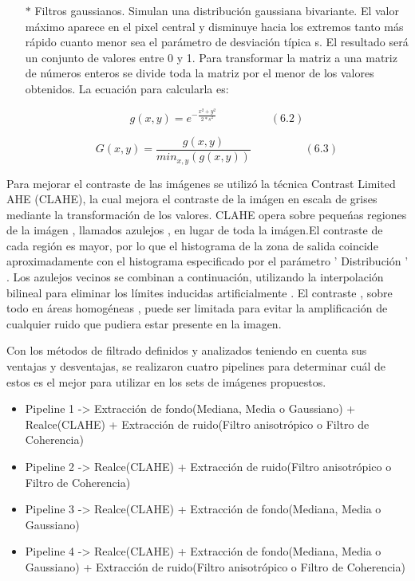 \begin{itemize}
	\item[$*$]Filtros gaussianos. Simulan una distribución gaussiana bivariante. El valor máximo aparece en el pixel central y disminuye hacia los extremos tanto más rápido cuanto menor sea el parámetro de desviación típica s. El resultado será un conjunto de valores entre 0 y 1. Para transformar la matriz a una matriz de números enteros se divide toda la matriz por el menor de los valores obtenidos. La ecuación para calcularla es:
	
	\begin{displaymath}
	g(x,y)=e^{-\frac{x^2+y^2}{2\ast s^2}} \hspace{2cm}(6.2)
	\end{displaymath}
	
	\begin{displaymath}
		G(x,y)=\frac{g(x,y)}{min_{x,y}(g(x,y))} \hspace{2cm}(6.3)
	\end{displaymath}
\end{itemize}


Para mejorar el contraste de las im\'agenes se utiliz\'o la t\'ecnica Contrast Limited AHE (CLAHE), la cual mejora el contraste  de la im\'agen en escala de grises mediante la transformaci\'on de los valores. CLAHE opera sobre peque\'nas regiones de la im\'agen , llamados azulejos , en lugar de toda la im\'agen.El contraste de cada regi\'on es mayor, por lo que el histograma de la zona de salida coincide aproximadamente con el histograma especificado por el parámetro ' Distribución ' . Los azulejos vecinos se combinan a continuación, utilizando la interpolación bilineal para eliminar los límites inducidas artificialmente . El contraste , sobre todo en áreas homogéneas , puede ser limitada para evitar la amplificación de cualquier ruido que pudiera estar presente en la imagen. \cite{wiki:clahe}


Con los métodos de filtrado definidos y analizados teniendo en cuenta sus ventajas y desventajas, se realizaron cuatro pipelines para determinar cu\'al de estos es el mejor para utilizar en los sets de im\'agenes propuestos.

\begin{itemize}
	    \item Pipeline 1 -> Extracci\'on de fondo(Mediana, Media o Gaussiano)  +  Realce(CLAHE)  +  Extracci\'on de ruido(Filtro anisotr\'opico o Filtro de Coherencia)
		\item Pipeline 2 -> Realce(CLAHE) +  Extracci\'on de ruido(Filtro anisotr\'opico o Filtro de Coherencia)
		\item Pipeline 3 -> Realce(CLAHE) +  Extracci\'on de fondo(Mediana, Media o Gaussiano)
		\item Pipeline 4 -> Realce(CLAHE)  + Extracci\'on de fondo(Mediana, Media o Gaussiano)   +  Extracci\'on de ruido(Filtro anisotr\'opico o Filtro de Coherencia)
\end{itemize}






